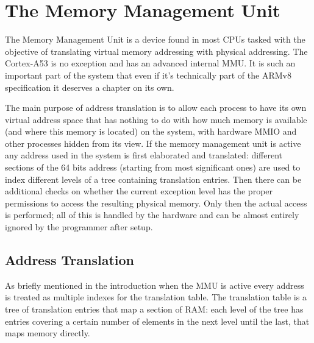\documentclass[12pt,a4paper,openright,twoside]{report}
\begin{document}
\clearpage{\pagestyle{empty}\cleardoublepage}
\chapter{The Memory Management Unit}
\label{mmu}
The Memory Management Unit is a device found in most CPUs tasked with the objective
of translating virtual memory addressing with physical addressing. The Cortex-A53
is no exception and has an advanced internal MMU. It is such an important part
of the system that even if it's technically part of the ARMv8 specification it 
deserves a chapter on its own.

The main purpose of address translation is to allow each process to have its own
virtual address space that has nothing to do with how much memory is available 
(and where this memory is located) on the system, with hardware MMIO and other
processes hidden from its view.
If the memory management unit is active any address used in the system is first
elaborated and translated: different sections of the 64 bits address (starting
from most significant ones) are used to index different levels of a tree containing
translation entries. Then there can be additional checks on whether the current
exception level has the proper permissions to access the resulting physical memory.
Only then the actual access is performed; all of this is handled by the hardware and 
can be almost entirely ignored by the programmer after setup.

\section{Address Translation}
As briefly mentioned in the introduction when the MMU is active every address is 
treated as multiple indexes for the translation table. The translation table is 
a tree of translation entries that map a section of RAM: each level of the 
tree has entries covering a certain number of elements in the next level until the 
last, that maps memory directly.
\end{document}
